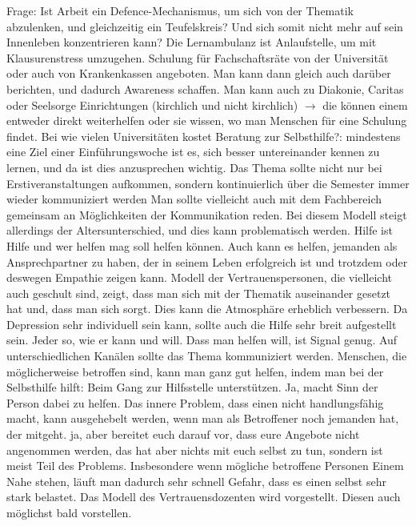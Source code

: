    Frage: Ist Arbeit ein Defence-Mechanismus, um sich von der Thematik abzulenken, und gleichzeitig ein Teufelskreis? Und sich somit nicht mehr auf sein Innenleben konzentrieren kann?
    Die Lernambulanz ist Anlaufstelle, um mit Klausurenstress umzugehen.
    Schulung für Fachschaftsräte von der Universität oder auch von Krankenkassen angeboten.
    Man kann dann gleich auch darüber berichten, und dadurch Awareness schaffen.
    Man kann auch zu Diakonie, Caritas oder Seelsorge Einrichtungen (kirchlich und nicht kirchlich) $\rightarrow$ die können einem entweder direkt weiterhelfen oder sie wissen, wo man Menschen für eine Schulung findet.
    Bei wie vielen Universitäten kostet Beratung zur Selbsthilfe?: mindestens eine
    Ziel einer Einführungswoche ist es, sich besser untereinander kennen zu lernen, und da ist dies anzusprechen wichtig.
    Das Thema sollte nicht nur bei Erstiveranstaltungen aufkommen, sondern kontinuierlich über die Semester immer wieder kommuniziert werden
    Man sollte vielleicht auch mit dem Fachbereich gemeinsam an Möglichkeiten der Kommunikation reden.
    Bei diesem Modell steigt allerdings der Altersunterschied, und dies kann problematisch werden.
    Hilfe ist Hilfe und wer helfen mag soll helfen können.
    Auch kann es helfen, jemanden als Ansprechpartner zu haben, der in seinem Leben erfolgreich ist und trotzdem oder deswegen Empathie zeigen kann.
    Modell der Vertrauenspersonen, die vielleicht auch geschult sind, zeigt, dass man sich mit der Thematik auseinander gesetzt hat und, dass man sich sorgt. Dies kann die Atmosphäre erheblich verbessern.
    Da Depression sehr individuell sein kann, sollte auch die Hilfe sehr breit aufgestellt sein. Jeder so, wie er kann und will. Dass man helfen will, ist Signal genug.
    Auf unterschiedlichen Kanälen sollte das Thema kommuniziert werden.
    Menschen, die möglicherweise betroffen sind, kann man ganz gut helfen, indem man bei der Selbsthilfe hilft: Beim Gang zur Hilfsstelle unterstützen.
    Ja, macht Sinn der Person dabei zu helfen. Das innere Problem, dass einen nicht handlungsfähig macht, kann ausgehebelt werden, wenn man als Betroffener noch jemanden hat, der mitgeht.
    ja, aber bereitet euch darauf vor, dass eure Angebote nicht angenommen werden, das hat aber nichts mit euch selbst zu tun, sondern ist meist Teil des Problems.
    Insbesondere wenn mögliche betroffene Personen Einem Nahe stehen, läuft man dadurch sehr schnell Gefahr, dass es einen selbst sehr stark belastet.
    Das Modell des Vertrauensdozenten wird vorgestellt. Diesen auch möglichst bald vorstellen.
